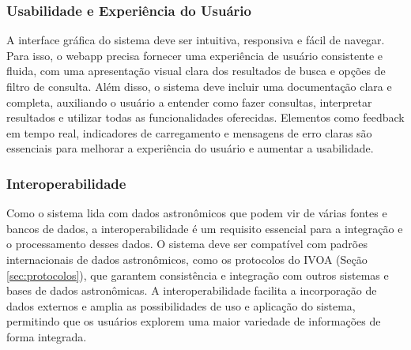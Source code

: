 \subsubsection{Usabilidade e Experiência do Usuário}
\label{sec:req-ux}

A interface gráfica do sistema deve ser intuitiva, responsiva e fácil de navegar. Para isso, o webapp precisa fornecer uma experiência de usuário consistente e fluida, com uma apresentação visual clara dos resultados de busca e opções de filtro de consulta. Além disso, o sistema deve incluir uma documentação clara e completa, auxiliando o usuário a entender como fazer consultas, interpretar resultados e utilizar todas as funcionalidades oferecidas. Elementos como feedback em tempo real, indicadores de carregamento e mensagens de erro claras são essenciais para melhorar a experiência do usuário e aumentar a usabilidade.






\subsubsection{Interoperabilidade}
\label{sec:req-inter}

Como o sistema lida com dados astronômicos que podem vir de várias fontes e bancos de dados, a interoperabilidade é um requisito essencial para a integração e o processamento desses dados. O sistema deve ser compatível com padrões internacionais de dados astronômicos, como os protocolos do IVOA (Seção \ref{sec:protocolos}), que garantem consistência e integração com outros sistemas e bases de dados astronômicas. A interoperabilidade facilita a incorporação de dados externos e amplia as possibilidades de uso e aplicação do sistema, permitindo que os usuários explorem uma maior variedade de informações de forma integrada.

